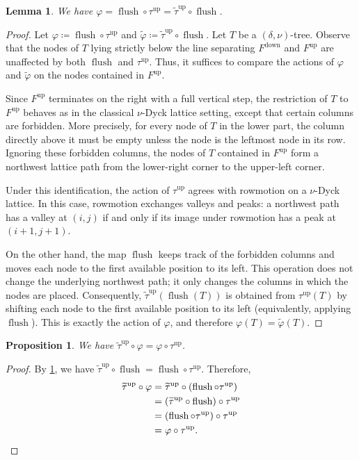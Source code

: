 \documentclass[11pt]{amsart}
\newcounter{valley}
\newcommand{\up}{^{\operatorname{up}}}
\newcommand{\down}{^{\operatorname{down}}}
\DeclareMathOperator{\flush}{flush}
\newtheorem{proposition}[theorem]{Proposition}
\newtheorem{lemma}[theorem]{Lemma}
\theoremstyle{definition}
\begin{document}
\begin{lemma} \label{lem:varphi_widetilde_varphi}
We have $ \varphi = \flush \circ \tau\up = \widetilde{\tau}\up \circ \flush$.
\end{lemma}

\begin{proof}
Let $\varphi \coloneqq \flush \circ \tau\up$ and $\widetilde \varphi \coloneqq \widetilde \tau\up \circ \flush$. Let $T$ be a $(\delta,\nu)$-tree. Observe that the nodes of $T$ lying strictly below the line separating $F\down$ and $F\up$ are unaffected by both $\flush$ and $\tau\up$. Thus, it suffices to compare the actions of $\varphi$ and $\widetilde{\varphi}$ on the nodes contained in $F\up$.

Since $F\up$ terminates on the right with a full vertical step, the restriction of $T$ to $F\up$ behaves as in the classical $\nu$-Dyck lattice setting, except that certain columns are forbidden. More precisely, for every node of $T$ in the lower part, the column directly above it must be empty unless the node is the leftmost node in its row. Ignoring these forbidden columns, the nodes of $T$ contained in $F\up$ form a northwest lattice path from the lower-right corner to the upper-left corner.

Under this identification, the action of $\tau\up$ agrees with rowmotion on a $\nu$-Dyck lattice. In this case, rowmotion exchanges valleys and peaks: a northwest path has a valley at $(i,j)$ if and only if its image under rowmotion has a peak at $(i+1,j+1)$.

On the other hand, the map $\flush$ keeps track of the forbidden columns and moves each node to the first available position to its left. This operation does not change the underlying northwest path; it only changes the columns in which the nodes are placed. Consequently, $\widetilde{\tau}\up(\flush(T))$ is obtained from $\tau\up(T)$ by shifting each node to the first available position to its left (equivalently, applying $\flush$). This is exactly the action of $\varphi$, and therefore $\varphi(T)=\widetilde{\varphi}(T)$.
\end{proof}

\begin{proposition} \label{prop:varphi_tau_up_commute}
We have $\widetilde{\tau}\up \circ \varphi = \varphi \circ \tau\up$.
\end{proposition}

\begin{proof}
By \cref{lem:varphi_widetilde_varphi}, we have $\widetilde{\tau}\up \circ \flush = \flush \circ \tau\up$. Therefore,
\begin{align*}
\widetilde{\tau}\up \circ \varphi
&= \widetilde{\tau}\up \circ (\flush \circ \tau\up) \\
&= (\widetilde{\tau}\up \circ \flush) \circ \tau\up \\
&= (\flush \circ \tau\up) \circ \tau\up \\
&= \varphi \circ \tau\up. \qedhere
\end{align*}
\end{proof}
\end{document}
